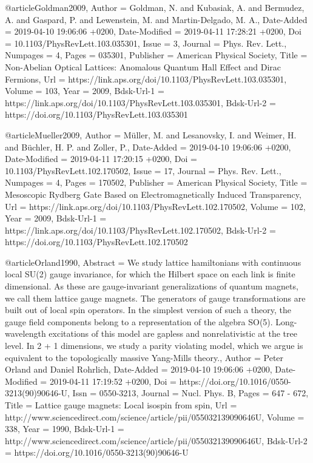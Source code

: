 \documentclass[epj,final]{svjour}
\begin{document}
{@article{Goldman2009,
	Author = {Goldman, N. and Kubasiak, A. and Bermudez, A. and Gaspard, P. and Lewenstein, M. and Martin-Delgado, M. A.},
	Date-Added = {2019-04-10 19:06:06 +0200},
	Date-Modified = {2019-04-11 17:28:21 +0200},
	Doi = {10.1103/PhysRevLett.103.035301},
	Issue = {3},
	Journal = {Phys. Rev. Lett.},
	Numpages = {4},
	Pages = {035301},
	Publisher = {American Physical Society},
	Title = {Non-Abelian Optical Lattices: Anomalous Quantum Hall Effect and Dirac Fermions},
	Url = {https://link.aps.org/doi/10.1103/PhysRevLett.103.035301},
	Volume = {103},
	Year = {2009},
	Bdsk-Url-1 = {https://link.aps.org/doi/10.1103/PhysRevLett.103.035301},
	Bdsk-Url-2 = {https://doi.org/10.1103/PhysRevLett.103.035301}}

@article{Mueller2009,
	Author = {M\"uller, M. and Lesanovsky, I. and Weimer, H. and B\"uchler, H. P. and Zoller, P.},
	Date-Added = {2019-04-10 19:06:06 +0200},
	Date-Modified = {2019-04-11 17:20:15 +0200},
	Doi = {10.1103/PhysRevLett.102.170502},
	Issue = {17},
	Journal = {Phys. Rev. Lett.},
	Numpages = {4},
	Pages = {170502},
	Publisher = {American Physical Society},
	Title = {Mesoscopic {Rydberg} Gate Based on Electromagnetically Induced Transparency},
	Url = {https://link.aps.org/doi/10.1103/PhysRevLett.102.170502},
	Volume = {102},
	Year = {2009},
	Bdsk-Url-1 = {https://link.aps.org/doi/10.1103/PhysRevLett.102.170502},
	Bdsk-Url-2 = {https://doi.org/10.1103/PhysRevLett.102.170502}}

@article{Orland1990,
	Abstract = {We study lattice hamiltonians with continuous local SU(2) gauge invariance, for which the Hilbert space on each link is finite dimensional. As these are gauge-invariant generalizations of quantum magnets, we call them lattice gauge magnets. The generators of gauge transformations are built out of local spin operators. In the simplest version of such a theory, the gauge field components belong to a representation of the algebra SO(5). Long-wavelength excitations of this model are gapless and nonrelativistic at the tree level. In 2 + 1 dimensions, we study a parity violating model, which we argue is equivalent to the topologically massive Yang-Mills theory.},
	Author = {Peter Orland and Daniel Rohrlich},
	Date-Added = {2019-04-10 19:06:06 +0200},
	Date-Modified = {2019-04-11 17:19:52 +0200},
	Doi = {https://doi.org/10.1016/0550-3213(90)90646-U},
	Issn = {0550-3213},
	Journal = {Nucl. Phys. B},
	Pages = {647 - 672},
	Title = {Lattice gauge magnets: Local isospin from spin},
	Url = {http://www.sciencedirect.com/science/article/pii/055032139090646U},
	Volume = {338},
	Year = {1990},
	Bdsk-Url-1 = {http://www.sciencedirect.com/science/article/pii/055032139090646U},
	Bdsk-Url-2 = {https://doi.org/10.1016/0550-3213(90)90646-U}}

}
\end{document}
